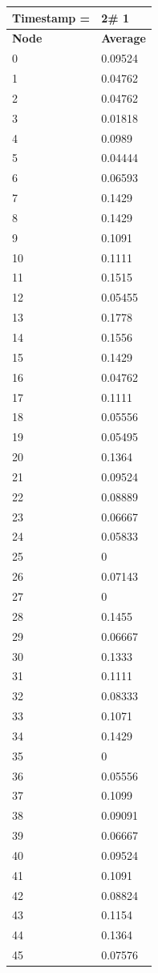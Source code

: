 \begin{tabular}{|l||l|}
\hline
\textbf{Timestamp =} & \textbf{2}\# 1\\\hline
	\textbf{Node} & \textbf{Average} \\ \hline
\hline
	0 & 0.09524 \\ \hline
	1 & 0.04762 \\ \hline
	2 & 0.04762 \\ \hline
	3 & 0.01818 \\ \hline
	4 & 0.0989 \\ \hline
	5 & 0.04444 \\ \hline
	6 & 0.06593 \\ \hline
	7 & 0.1429 \\ \hline
	8 & 0.1429 \\ \hline
	9 & 0.1091 \\ \hline
	10 & 0.1111 \\ \hline
	11 & 0.1515 \\ \hline
	12 & 0.05455 \\ \hline
	13 & 0.1778 \\ \hline
	14 & 0.1556 \\ \hline
	15 & 0.1429 \\ \hline
	16 & 0.04762 \\ \hline
	17 & 0.1111 \\ \hline
	18 & 0.05556 \\ \hline
	19 & 0.05495 \\ \hline
	20 & 0.1364 \\ \hline
	21 & 0.09524 \\ \hline
	22 & 0.08889 \\ \hline
	23 & 0.06667 \\ \hline
	24 & 0.05833 \\ \hline
	25 & 0 \\ \hline
	26 & 0.07143 \\ \hline
	27 & 0 \\ \hline
	28 & 0.1455 \\ \hline
	29 & 0.06667 \\ \hline
	30 & 0.1333 \\ \hline
	31 & 0.1111 \\ \hline
	32 & 0.08333 \\ \hline
	33 & 0.1071 \\ \hline
	34 & 0.1429 \\ \hline
	35 & 0 \\ \hline
	36 & 0.05556 \\ \hline
	37 & 0.1099 \\ \hline
	38 & 0.09091 \\ \hline
	39 & 0.06667 \\ \hline
	40 & 0.09524 \\ \hline
	41 & 0.1091 \\ \hline
	42 & 0.08824 \\ \hline
	43 & 0.1154 \\ \hline
	44 & 0.1364 \\ \hline
	45 & 0.07576 \\ \hline
\end{tabular}

